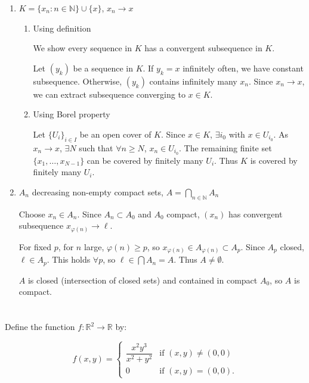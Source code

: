 \documentclass[12pt]{article}
\begin{document}
\begin{answerbox}
  \begin{enumerate}
    \item $K = \{x_n : n \in \mathbb{N}\} \cup \{x\}$, $x_n \to x$
    \begin{enumerate}
      \item Using definition 
      
      We show every sequence in $K$ has a convergent subsequence in $K$.

      Let $(y_k)$ be a sequence in $K$. If $y_k = x$ infinitely often, we have constant subsequence. Otherwise, $(y_k)$ contains infinitely many $x_n$. Since $x_n \to x$, we can extract subsequence converging to $x \in K$.

      \item Using Borel property 
      
      Let $\{U_i\}_{i \in I}$ be an open cover of $K$. Since $x \in K$, $\exists i_0$ with $x \in U_{i_0}$. As $x_n \to x$, $\exists N$ such that $\forall n \ge N$, $x_n \in U_{i_0}$. The remaining finite set $\{x_1,\dots,x_{N-1}\}$ can be covered by finitely many $U_i$. Thus $K$ is covered by finitely many $U_i$.
      \end{enumerate}
    \item $A_n$ decreasing non-empty compact sets, $A = \bigcap_{n\in\mathbb{N}} A_n$

      Choose $x_n \in A_n$. Since $A_n \subset A_0$ and $A_0$ compact, $(x_n)$ has convergent subsequence $x_{\varphi(n)} \to \ell$.

      For fixed $p$, for $n$ large, $\varphi(n) \ge p$, so $x_{\varphi(n)} \in A_{\varphi(n)} \subset A_p$. Since $A_p$ closed, $\ell \in A_p$. This holds $\forall p$, so $\ell \in \bigcap A_n = A$. Thus $A \neq \emptyset$.

      $A$ is closed (intersection of closed sets) and contained in compact $A_0$, so $A$ is compact.

  \end{enumerate}
\end{answerbox}

\section{}
Define the function \( f : \mathbb{R}^2 \longrightarrow \mathbb{R} \) by:  

\[
f(x,y) = 
\begin{cases} 
\dfrac{x^2 y^3}{x^2 + y^2} & \text{if } (x,y) \neq (0,0) \\ 
0 & \text{if } (x,y) = (0,0).
\end{cases}
\]
\end{document}
